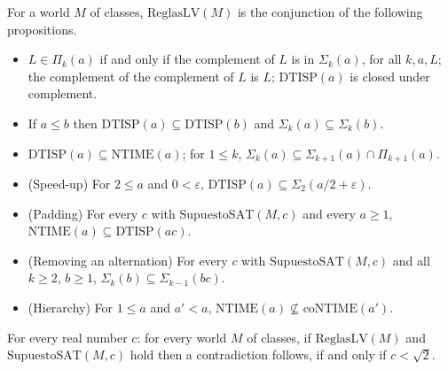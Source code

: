 \begin{definition}
  \label{def:search-reglas-lv}
  \leanok
  For a world $M$ of classes, $\mathrm{ReglasLV}(M)$ is the conjunction of the following
  propositions.
  \begin{itemize}
    \item $L \in \Pi_k(a)$ if and only if the complement of $L$ is in $\Sigma_k(a)$, for all $k, a, L$;
      the complement of the complement of $L$ is $L$; $\mathrm{DTISP}(a)$ is closed under complement.
    \item If $a \le b$ then $\mathrm{DTISP}(a) \subseteq \mathrm{DTISP}(b)$ and
      $\Sigma_k(a) \subseteq \Sigma_k(b)$.
    \item $\mathrm{DTISP}(a) \subseteq \mathrm{NTIME}(a)$; for $1 \le k$, $\Sigma_k(a) \subseteq
      \Sigma_{k+1}(a) \cap \Pi_{k+1}(a)$.
    \item (Speed-up) For $2 \le a$ and $0 < \varepsilon$, $\mathrm{DTISP}(a) \subseteq \Sigma_2(a/2 +
      \varepsilon)$.
    \item (Padding) For every $c$ with $\mathrm{SupuestoSAT}(M, c)$ and every $a \ge 1$,
      $\mathrm{NTIME}(a) \subseteq \mathrm{DTISP}(a c)$.
    \item (Removing an alternation) For every $c$ with $\mathrm{SupuestoSAT}(M, c)$ and all $k \ge 2$,
      $b \ge 1$, $\Sigma_k(b) \subseteq \Sigma_{k-1}(b c)$.
    \item (Hierarchy) For $1 \le a$ and $a' < a$, $\mathrm{NTIME}(a) \not\subseteq \mathrm{coNTIME}(a')$.
  \end{itemize}
\end{definition}

\begin{theorem}
  \label{thm:search-umbral-lv}
  \leanok
  For every real number $c$: for every world $M$ of classes, if $\mathrm{ReglasLV}(M)$ and
  $\mathrm{SupuestoSAT}(M, c)$ hold then a contradiction follows, if and only if $c < \sqrt{2}$.
\end{theorem}

